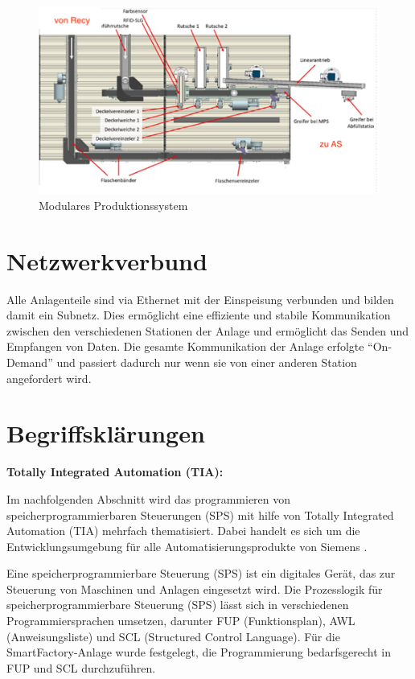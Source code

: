 \begin{figure}[h!] %
    \centering
    \includegraphics*{figures/mps.png}
    \caption{Modulares Produktionssystem\cite{siemens2022}} %
    \label{fig:MPS} %
\end{figure}
\FloatBarrier

\section{Netzwerkverbund}\label{sec:Netzwerkverbund}

Alle Anlagenteile sind via Ethernet mit der Einspeisung verbunden und bilden damit ein Subnetz. Dies ermöglicht eine 
effiziente und stabile Kommunikation zwischen den verschiedenen Stationen der Anlage und ermöglicht das Senden und Empfangen von Daten.
Die gesamte Kommunikation der Anlage erfolgte “On-Demand” und passiert dadurch nur wenn sie von einer anderen Station angefordert wird.

\section{Begriffsklärungen}\label{sec:Begriffsklärungen}

\textbf{Totally Integrated Automation (TIA):}

Im nachfolgenden Abschnitt wird das programmieren von speicherprogrammierbaren Steuerungen (SPS) mit hilfe von Totally Integrated Automation (TIA) 
mehrfach thematisiert. Dabei handelt es sich um die Entwicklungsumgebung für alle Automatisierungsprodukte von Siemens \cite{bee2022}.

Eine speicherprogrammierbare Steuerung (SPS) ist ein digitales Gerät, das zur Steuerung von Maschinen und Anlagen eingesetzt wird.
Die Prozesslogik für speicherprogrammierbare Steuerung (SPS) lässt sich in verschiedenen Programmiersprachen umsetzen, 
darunter FUP (Funktionsplan), AWL (Anweisungsliste) und SCL (Structured Control Language). Für die SmartFactory-Anlage 
wurde festgelegt, die Programmierung bedarfsgerecht in FUP und SCL durchzuführen.

